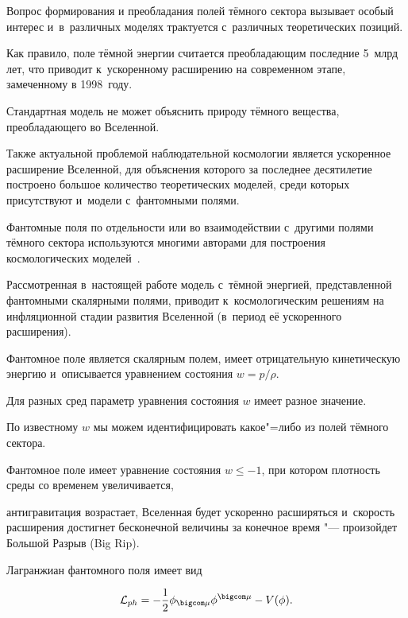 Вопрос формирования и преобладания полей тёмного сектора вызывает особый интерес и~в~различных моделях трактуется с~различных теоретических позиций.

Как правило, поле тёмной энергии считается преобладающим последние 5~млрд лет, что приводит к~ускоренному расширению на современном этапе, замеченному в 1998~году.

Стандартная модель не может объяснить природу тёмного вещества, преобладающего во Вселенной.

Также актуальной проблемой наблюдательной космологии является ускоренное расширение Вселенной, для объяснения которого за последнее десятилетие построено большое количество теоретических моделей, среди которых присутствуют и~модели с~фантомными полями. 

Фантомные поля по отдельности или во взаимодействии с~другими полями тёмного сектора используются многими авторами для построения космологических моделей~\cite{chervon:cst}.



Рассмотренная в~настоящей работе модель с~тёмной энергией, представленной фантомными скалярными полями, приводит к~космологическим решениям на инфляционной стадии развития Вселенной (в~период её ускоренного расширения).



Фантомное поле является скалярным полем, имеет отрицательную кинетическую энергию и~описывается уравнением состояния $ w=p / \rho $. 

Для разных сред параметр уравнения состояния $w$ имеет разное значение. 

По известному $w$ мы можем идентифицировать какое"=либо из полей тёмного сектора.

Фантомное поле имеет уравнение состояния $ w \leq -1$, при котором плотность среды со временем увеличивается,

антигравитация возрастает, Вселенная будет ускоренно расширяться и~скорость расширения достигнет бесконечной величины за конечное время "--- произойдет Большой Разрыв (Big Rip).





Лагранжиан фантомного поля имеет вид~\cite{chervon:fks,chervon:wald}%

\begin{equation}\label{equ:cher:L_ph}

{\cal L}_{ph} = -\frac12 \phi_{\bigcom \mu} \phi^{\bigcom \mu} - V(\phi).%

\end{equation}

